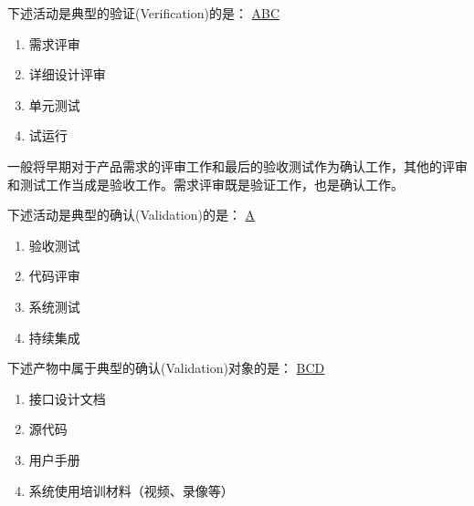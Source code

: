 \begin{problem}
	下述活动是典型的验证(Verification)的是：
	\uline{ABC}    
    \vspace{-0.8em}
    \begin{multicols}{4}
        \begin{enumerate}[label=\Alph*.]
            \item 需求评审
            \item 详细设计评审
            \item 单元测试
            \item 试运行
        \end{enumerate}
    \end{multicols}
    \vspace{-1em}
\end{problem}

\begin{solution}
一般将早期对于产品需求的评审工作和最后的验收测试作为确认工作，其他的评审和测试工作当成是验收工作。需求评审既是验证工作，也是确认工作。
\end{solution}



\begin{problem}
	下述活动是典型的确认(Validation)的是：
	\uline{A}    
    \vspace{-0.8em}
    \begin{multicols}{4}
        \begin{enumerate}[label=\Alph*.]
            \item 验收测试
            \item 代码评审
            \item 系统测试
            \item 持续集成
        \end{enumerate}
    \end{multicols}
    \vspace{-1em}
\end{problem}



\begin{problem}
    下述产物中属于典型的确认(Validation)对象的是：
    \uline{BCD}    
    \vspace{-0.8em}
    \begin{multicols}{2}
        \begin{enumerate}[label=\Alph*.]
            \item 接口设计文档
            \item 源代码
            \item 用户手册
            \item 系统使用培训材料（视频、录像等）
        \end{enumerate}
    \end{multicols}
    \vspace{-1em}
\end{problem}

